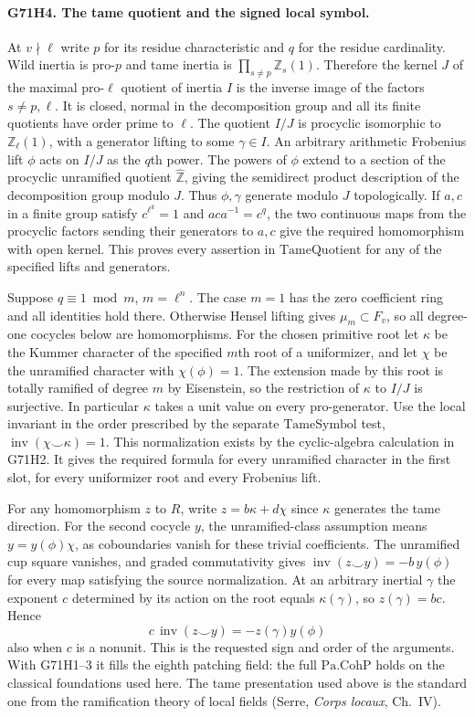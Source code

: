 \paragraph{G71H4. The tame quotient and the signed local symbol.}
At $v\nmid\ell$ write $p$ for its residue characteristic and
$q$ for the residue cardinality. Wild inertia is pro-$p$ and
tame inertia is $\prod_{s\ne p}\mathbb Z_s(1)$. Therefore the
kernel $J$ of the maximal pro-$\ell$ quotient of inertia $I$ is
the inverse image of the factors $s\ne p,\ell$. It is closed,
normal in the decomposition group and all its finite quotients
have order prime to $\ell$. The quotient $I/J$ is procyclic
isomorphic to $\mathbb Z_\ell(1)$, with a generator lifting to
some $\gamma\in I$. An arbitrary arithmetic Frobenius lift
$\phi$ acts on $I/J$ as the $q$th power. The powers of $\phi$
extend to a section of the procyclic unramified quotient
$\widehat{\mathbb Z}$, giving the semidirect product description
of the decomposition group modulo $J$. Thus $\phi,\gamma$
generate modulo $J$ topologically. If $a,c$ in a finite group
satisfy $c^{\ell^k}=1$ and $aca^{-1}=c^q$, the two continuous
maps from the procyclic factors sending their generators to
$a,c$ give the required homomorphism with open kernel. This
proves every assertion in $\mathrm{TameQuotient}$ for any of
the specified lifts and generators.

Suppose $q\equiv1\bmod m$, $m=\ell^n$. The case $m=1$ has
the zero coefficient ring and all identities hold there.
Otherwise Hensel lifting gives $\mu_m\subset F_v$, so all
degree-one cocycles below are homomorphisms. For the chosen
primitive root let $\kappa$ be the Kummer character of the
specified $m$th root of a uniformizer, and let $\chi$ be the
unramified character with $\chi(\phi)=1$. The extension made
by this root is totally ramified of degree $m$ by Eisenstein,
so the restriction of $\kappa$ to $I/J$ is surjective. In
particular $\kappa$ takes a unit value on every pro-generator.
Use the local invariant in the order prescribed by the
separate $\mathrm{TameSymbol}$ test,
$\operatorname{inv}(\chi\smile\kappa)=1$. This normalization
exists by the cyclic-algebra calculation in G71H2. It gives
the required formula for every unramified character in the
first slot, for every uniformizer root and every Frobenius lift.

For any homomorphism $z$ to $R$, write $z=b\kappa+d\chi$
since $\kappa$ generates the tame direction. For the second
cocycle $y$, the unramified-class assumption means $y=y(\phi)\chi$,
as coboundaries vanish for these trivial coefficients.
The unramified cup square vanishes, and graded commutativity
gives $\operatorname{inv}(z\smile y)=-b\,y(\phi)$ for every
map satisfying the source normalization. At an arbitrary
inertial $\gamma$ the exponent $c$ determined by its action on
the root equals $\kappa(\gamma)$, so $z(\gamma)=b c$. Hence
\[
       c\,\operatorname{inv}(z\smile y)=-z(\gamma)y(\phi)
\]
also when $c$ is a nonunit. This is the requested sign and
order of the arguments. With G71H1--3 it fills the eighth
patching field: the full $\mathrm{Pa.CohP}$ holds on the
classical foundations used here. The tame presentation used
above is the standard one from the ramification theory of
local fields (Serre, \emph{Corps locaux}, Ch.~IV).
